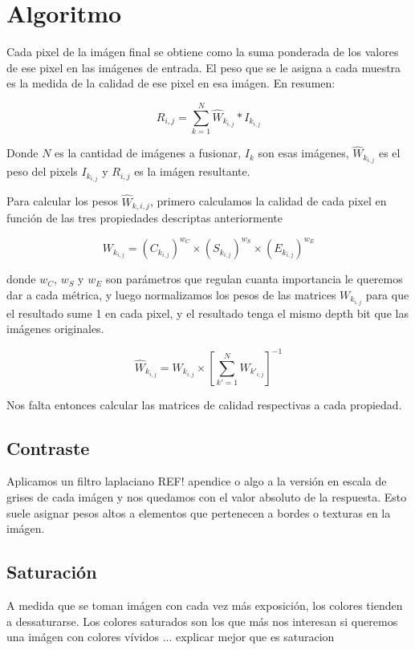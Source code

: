 \documentclass[a4paper,10pt]{article}
\newcommand{\attention}[1]{ {\color{red}#1} }
\begin{document}
    \section{Algoritmo}

        Cada pixel de la imágen final se obtiene como la suma ponderada de los valores de ese pixel en las imágenes de entrada. El peso que se le asigna a cada muestra es la medida de la calidad de ese pixel en esa imágen. En resumen:

        $$ R_{i,j} = \sum_{k=1}^N{ \hat{W}_{k_{i,j}}*I_{k_{i,j}} } $$

        Donde $N$ es la cantidad de imágenes a fusionar, $I_k$ son esas imágenes, $\hat{W}_{k_{i,j}}$ es el peso del pixels $I_{k_{i,j}}$ y $R_{i,j}$ es la imágen resultante.

        Para calcular los pesos $\hat{W}_{k,i,j}$, primero calculamos la calidad de cada pixel en función de las tres propiedades descriptas anteriormente

        $$ W_{k_{i,j}} = (C_{k_{i,j}})^{w_C} \times (S_{k_{i,j}})^{w_S} \times (E_{k_{i,j}})^{w_E} $$

        donde $w_C$, $w_S$ y $w_E$ son parámetros que regulan cuanta importancia le queremos dar a cada métrica, y luego normalizamos los pesos de las matrices $W_{k_{i,j}}$ para que el resultado sume 1 en cada pixel, y el resultado tenga el mismo \attention{depth bit} que las imágenes originales.

        $$ \hat{W}_{k_{i,j}} = W_{k_{i,j}} \times [\sum_{k'=1}^N{W_{k'_{i,j}}}]^{-1} $$ 

        Nos falta entonces calcular las matrices de calidad respectivas a cada propiedad.

        \subsection{Contraste}

            Aplicamos un filtro laplaciano \attention{REF! apendice o algo} a la versión en escala de grises de cada imágen y nos quedamos con el valor absoluto de la respuesta. Esto suele asignar pesos altos a elementos que pertenecen a bordes o texturas en la imágen.

        \subsection{Saturación}

            A medida que se toman imágen con cada vez más exposición, los colores tienden a dessaturarse. Los colores saturados son los que más nos interesan si queremos una imágen con colores vívidos ... \attention{explicar mejor que es saturacion}
\end{document}
